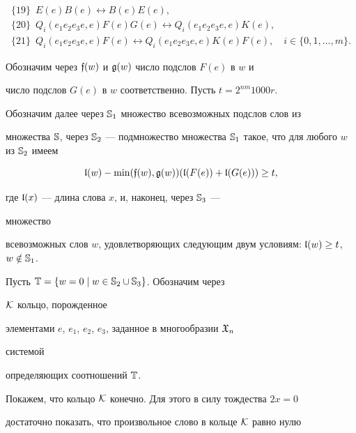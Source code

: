 \begin{gather*} 


\{19\}\ \;E(e)B(e)\leftrightarrow B(e)E(e),\\ 


\{20\}\ \; Q_i(e_1e_2e_3e,e)F(e)G(e)\leftrightarrow 


Q_i(e_1e_2e_3e,e)K(e),\\ 


\{21\}\ \; Q_i(e_1e_2e_3e,e)F(e)\leftrightarrow 


Q_i(e_1e_2e_3e,e)K(e)F(e),\quad i\in\{0,1,\dotsc,m\}. 


\end{gather*} 


 


Обозначим через $\frak f(w)$ и $\frak g(w)$ число подслов $F(e)$ в $w$ и 


число подслов $G(e)$ в $w$ соответственно. Пусть $t=2^{nm}1000r$. 


Обозначим далее через $\Bbb S_1$ множество всевозможных подслов слов из 


множества $\Bbb S$, через $\Bbb S_2$ --- подмножество множества $\Bbb 


S_1$ такое, что для любого $w$ из $\Bbb S_2$ имеем 


$$ 


\frak l(w)-\min(\frak f(w),\frak g(w))(\frak l(F(e))+\frak l(G(e)))\ge 


t, 


$$ 


где $\frak l(x)$ --- длина слова $x$, и, наконец, через $\Bbb S_3$ ---


множество  


всевозможных слов $w$, удовлетворяющих следующим двум условиям: $\frak 


l(w)\ge t$, $w\notin\Bbb S_1$. 


Пусть $\Bbb T=\{w=0\mid w\in\Bbb S_2\cup\Bbb S_3\}$. Обозначим через 


$\cal K$ кольцо, порожденное  


элементами $e$, $e_1$, $e_2$, $e_3$, заданное в многообразии $\frak X_n$ 


системой  


определяющих соотношений $\Bbb T$. 


 


Покажем, что кольцо $\cal K$ конечно. Для этого в силу тождества $2x=0$ 


достаточно показать, что произвольное слово в кольце $\cal K$ равно нулю 


